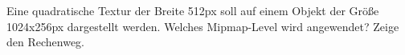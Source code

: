\documentclass[../../main.tex]{subfiles}
\begin{document}
Eine quadratische Textur der Breite 512px soll auf einem Objekt der Größe  1024x256px dargestellt werden. Welches Mipmap-Level wird angewendet? Zeige den Rechenweg.
\end{document}
